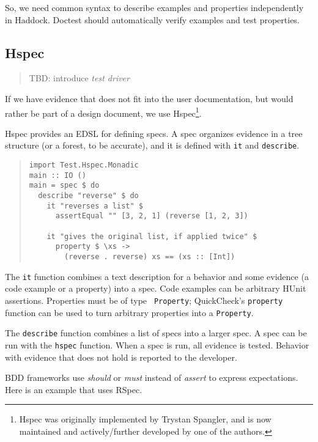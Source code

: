 \documentclass[preprint]{sigplanconf}
\begin{document}
So, we need common syntax to describe examples and properties
independently in Haddock. Doctest should automatically verify
examples and test properties.

\subsection{Hspec}


\begin{quote}
    TBD: introduce \emph{test driver}
\end{quote}

If we have evidence that does not fit into the user documentation, but
would rather be part of a design document, we use Hspec\footnote{%
Hspec was originally implemented by Trystan Spangler, and is now
maintained and actively/further developed by one of the authors.}.

Hspec provides an EDSL for defining specs.  A spec organizes evidence
in a tree structure (or a forest, to be accurate), and it is defined
with \texttt{it} and \texttt{describe}.

\begin{quote}
\small
\begin{verbatim}
import Test.Hspec.Monadic
main :: IO ()
main = spec $ do
  describe "reverse" $ do
    it "reverses a list" $
      assertEqual "" [3, 2, 1] (reverse [1, 2, 3])

    it "gives the original list, if applied twice" $
      property $ \xs ->
        (reverse . reverse) xs == (xs :: [Int])
\end{verbatim}
\end{quote}

\noindent The {\tt it} function combines a text description for a
behavior and some evidence (a code example or a property) into a spec.
Code examples can be arbitrary HUnit assertions.  Properties must be of type {\tt
Property}; QuickCheck's \texttt{property} function can be used to turn
arbitrary properties into a \texttt{Property}.

The \texttt{describe} function combines a list of specs into a larger spec.
A spec can be run with the \texttt{hspec} function.  When a spec is
run, all evidence is tested.  Behavior with evidence that does not
hold is reported to the developer.

BDD frameworks use \emph{should} or \emph{must} instead of
\emph{assert} to express expectations.  Here is an example that uses
RSpec.
\end{document}
